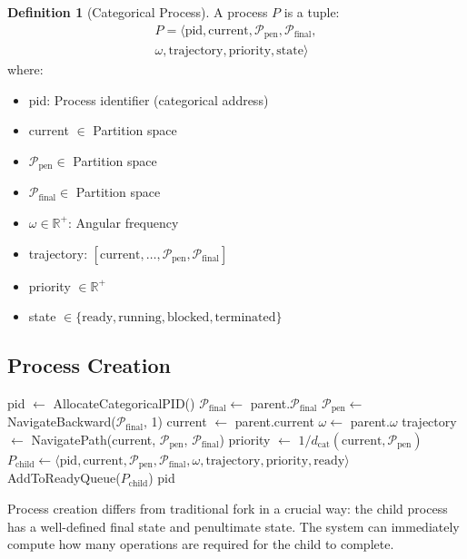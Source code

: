 \documentclass[twocolumn,10pt]{article}
\theoremstyle{definition}
\newtheorem{definition}[theorem]{Definition}
\theoremstyle{remark}
\newcommand{\pentstate}{\mathcal{P}_{\text{pen}}}
\newcommand{\finalstate}{\mathcal{P}_{\text{final}}}
\newcommand{\dcat}{d_{\text{cat}}}
\begin{document}
\begin{definition}[Categorical Process]
A process $P$ is a tuple:
\begin{multline}
    P = \langle \text{pid}, \text{current}, \pentstate, \finalstate, \\
    \omega, \text{trajectory}, \text{priority}, \text{state} \rangle
\end{multline}
where:
\begin{itemize}
    \item pid: Process identifier (categorical address)
    \item current $\in$ Partition space
    \item $\pentstate \in$ Partition space
    \item $\finalstate \in$ Partition space
    \item $\omega \in \mathbb{R}^+$: Angular frequency
    \item trajectory: $[\text{current}, \ldots, \pentstate, \finalstate]$
    \item priority $\in \mathbb{R}^+$
    \item state $\in \{\text{ready}, \text{running}, \text{blocked}, \text{terminated}\}$
\end{itemize}
\end{definition}

\subsection{Process Creation}

\begin{algorithm}
\caption{Process Creation (Fork)}
\begin{algorithmic}[1]
    \State pid $\gets$ AllocateCategoricalPID()
    \State $\finalstate \gets$ parent.$\finalstate$
    \State $\pentstate \gets$ NavigateBackward($\finalstate$, 1)
    \State current $\gets$ parent.current
    \State $\omega \gets$ parent.$\omega$
    \State trajectory $\gets$ NavigatePath(current, $\pentstate$, $\finalstate$)
    \State priority $\gets$ $1 / \dcat(\text{current}, \pentstate)$
    \State $P_{\text{child}} \gets \langle \text{pid}, \text{current}, \pentstate, \finalstate, \omega, \text{trajectory}, \text{priority}, \text{ready} \rangle$
    \State AddToReadyQueue($P_{\text{child}}$)
    \State \Return pid
\EndFunction
\end{algorithmic}
\end{algorithm}

Process creation differs from traditional fork in a crucial way: the child process has a well-defined final state and penultimate state. The system can immediately compute how many operations are required for the child to complete.
\end{document}
